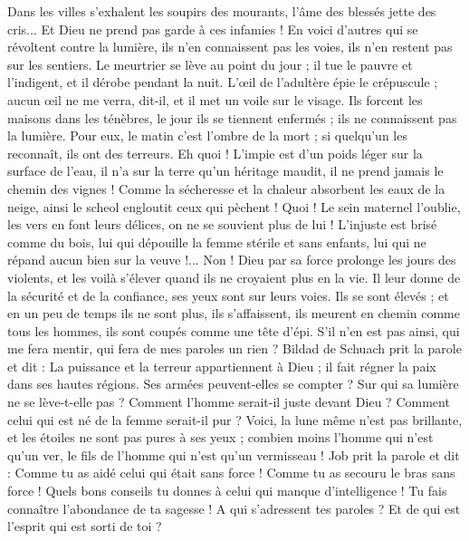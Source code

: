 \begin{multicols}{2}
Dans les villes s'exhalent les soupirs des mourants, l'âme des blessés jette des cris... Et Dieu ne prend pas garde à ces infamies !
En voici d'autres qui se révoltent contre la lumière, ils n'en connaissent pas les voies, ils n'en restent pas sur les sentiers.
Le meurtrier se lève au point du jour ; il tue le pauvre et l'indigent, et il dérobe pendant la nuit.
L'œil de l'adultère épie le crépuscule ; aucun œil ne me verra, dit-il, et il met un voile sur le visage.
Ils forcent les maisons dans les ténèbres, le jour ils se tiennent enfermés ; ils ne connaissent pas la lumière.
Pour eux, le matin c'est l'ombre de la mort ; si quelqu'un les reconnaît, ils ont des terreurs.
Eh quoi ! L'impie est d'un poids léger sur la surface de l'eau, il n'a sur la terre qu'un héritage maudit, il ne prend jamais le chemin des vignes !
Comme la sécheresse et la chaleur absorbent les eaux de la neige, ainsi le scheol engloutit ceux qui pèchent !
Quoi ! Le sein maternel l'oublie, les vers en font leurs délices, on ne se souvient plus de lui ! L'injuste est brisé comme du bois,
lui qui dépouille la femme stérile et sans enfants, lui qui ne répand aucun bien sur la veuve !...
Non ! Dieu par sa force prolonge les jours des violents, et les voilà s’élever quand ils ne croyaient plus en la vie.
Il leur donne de la sécurité et de la confiance, ses yeux sont sur leurs voies.
Ils se sont élevés ; et en un peu de temps ils ne sont plus, ils s'affaissent, ils meurent en chemin comme tous les hommes, ils sont coupés comme une tête d'épi.
S'il n'en est pas ainsi, qui me fera mentir, qui fera de mes paroles un rien ?
\VerseOne{}Bildad de Schuach prit la parole et dit :
La puissance et la terreur appartiennent à Dieu ; il fait régner la paix dans ses hautes régions.
Ses armées peuvent-elles se compter ? Sur qui sa lumière ne se lève-t-elle pas ?
Comment l'homme serait-il juste devant Dieu ?  Comment celui qui est né de la femme serait-il pur ?
Voici, la lune même n'est pas brillante, et les étoiles ne sont pas pures à ses yeux ;
combien moins l'homme qui n'est qu'un ver, le fils de l'homme qui n'est qu'un vermisseau !
\VerseOne{}Job prit la parole et dit :
Comme tu as aidé celui qui était sans force ! Comme tu as secouru le bras sans force !
Quels bons conseils tu donnes à celui qui manque d'intelligence ! Tu fais connaître l'abondance de ta sagesse !
A qui s'adressent tes paroles ? Et de qui est l'esprit qui est sorti de toi ?

\end{multicols}
